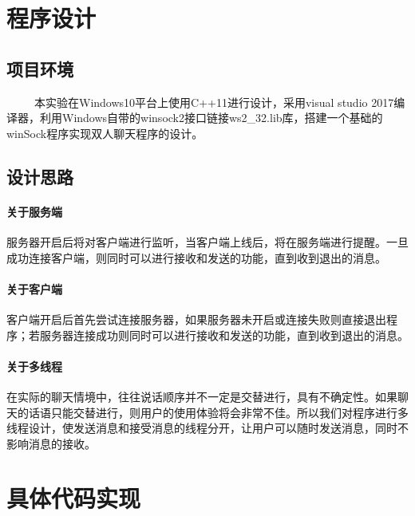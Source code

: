 \documentclass{article}
\begin{document}
\section{程序设计}
\subsection{项目环境}
\large
\ \ \ \ \ 本实验在Windows10平台上使用C++11进行设计，采用visual studio 2017编译器，利用Windows自带的winsock2接口链接ws2\_32.lib库，搭建一个基础的winSock程序实现双人聊天程序的设计。
\subsection{设计思路}
\large
\paragraph{关于服务端}
服务器开启后将对客户端进行监听，当客户端上线后，将在服务端进行提醒。一旦成功连接客户端，则同时可以进行接收和发送的功能，直到收到退出的消息。
\large
\paragraph{关于客户端}
客户端开启后首先尝试连接服务器，如果服务器未开启或连接失败则直接退出程序；若服务器连接成功则同时可以进行接收和发送的功能，直到收到退出的消息。
\large
\paragraph{关于多线程}
在实际的聊天情境中，往往说话顺序并不一定是交替进行，具有不确定性。如果聊天的话语只能交替进行，则用户的使用体验将会非常不佳。所以我们对程序进行多线程设计，使发送消息和接受消息的线程分开，让用户可以随时发送消息，同时不影响消息的接收。
\newpage
\section{具体代码实现}
\end{document}
